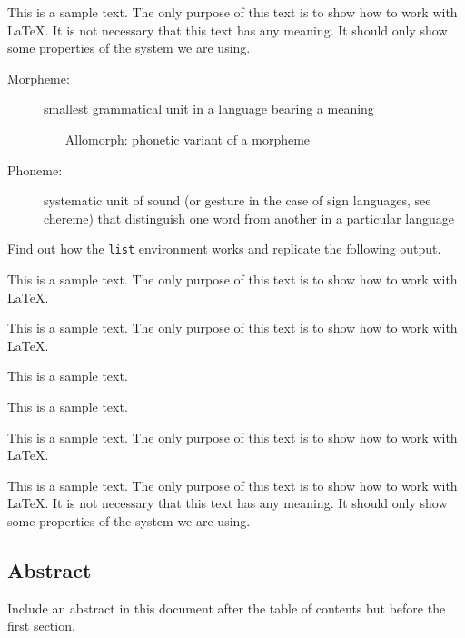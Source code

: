 \documentclass[10pt, paper=a4, abstracton]{scrartcl}
\begin{document}
This is a sample text. The only purpose of this text is to show how to work with \LaTeX . It is not necessary that this text has any meaning. It should only show some properties of the system we are using.

\begin{description}
	\item[Morpheme:] smallest grammatical unit in a language bearing a meaning
	
	\begin{itemize}
		\item[Allomorph:] phonetic variant of a morpheme 
	\end{itemize}
	
	\item[Phoneme:] systematic unit of sound (or gesture in the case of sign 
	languages, see chereme) that distinguish one word from another in a particular 
	language
\end{description}

Find out how the \texttt{list} environment works and replicate the following output.

\begin{list}{--}{\footnotesize }
	\item This is a sample text. The only purpose of this text is to show how to work with \LaTeX .
	\item This is a sample text. The only purpose of this text is to show how to work with \LaTeX .
	\begin{list}{-}{}
		\item This is a sample text. 
		\item This is a sample text. 
	\end{list}
	\item This is a sample text. The only purpose of this text is to show how to work with \LaTeX .
\end{list}

This is a sample text. The only purpose of this text is to show how to work with \LaTeX . It is not necessary that this text has any meaning. It should only show some properties of the system we are using.


\subsection{Abstract}

Include an abstract in this document after the table of contents but before the first section.
\end{document}
